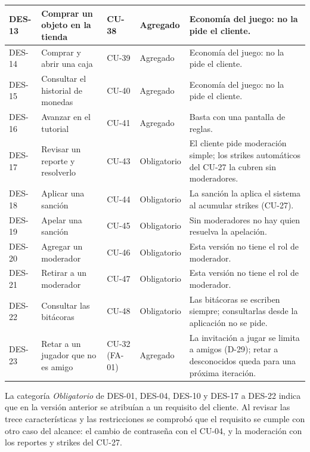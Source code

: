 \begin{center}
\begin{longtable}{|L{0.075\textwidth}|L{0.25\textwidth}|L{0.07\textwidth}|L{0.11\textwidth}|L{0.37\textwidth}|}
\mbox{DES-13} & Comprar un objeto en la tienda & CU-38 & Agregado & Economía del juego: no la pide el cliente. \\ \hline
\mbox{DES-14} & Comprar y abrir una caja & CU-39 & Agregado & Economía del juego: no la pide el cliente. \\ \hline
\mbox{DES-15} & Consultar el historial de monedas & CU-40 & Agregado & Economía del juego: no la pide el cliente. \\ \hline
\mbox{DES-16} & Avanzar en el tutorial & CU-41 & Agregado & Basta con una pantalla de reglas. \\ \hline
\mbox{DES-17} & Revisar un reporte y resolverlo & CU-43 & Obligatorio & El cliente pide moderación simple; los strikes automáticos del \mbox{CU-27} la cubren sin moderadores. \\ \hline
\mbox{DES-18} & Aplicar una sanción & CU-44 & Obligatorio & La sanción la aplica el sistema al acumular strikes (\mbox{CU-27}). \\ \hline
\mbox{DES-19} & Apelar una sanción & CU-45 & Obligatorio & Sin moderadores no hay quien resuelva la apelación. \\ \hline
\mbox{DES-20} & Agregar un moderador & CU-46 & Obligatorio & Esta versión no tiene el rol de moderador. \\ \hline
\mbox{DES-21} & Retirar a un moderador & CU-47 & Obligatorio & Esta versión no tiene el rol de moderador. \\ \hline
\mbox{DES-22} & Consultar las bitácoras & CU-48 & Obligatorio & Las bitácoras se escriben siempre; consultarlas desde la aplicación no se pide. \\ \hline
\mbox{DES-23} & Retar a un jugador que no es amigo & CU-32 (\mbox{FA-01}) & Agregado & La invitación a jugar se limita a amigos (\mbox{D-29}); retar a desconocidos queda para una próxima iteración. \\ \hline
\end{longtable}
\end{center}

La categoría \textit{Obligatorio} de \mbox{DES-01}, \mbox{DES-04}, \mbox{DES-10} y \mbox{DES-17} a \mbox{DES-22} indica que en la versión anterior se atribuían a un requisito del cliente. Al revisar las trece características y las restricciones se comprobó que el requisito se cumple con otro caso del alcance: el cambio de contraseña con el \mbox{CU-04}, y la moderación con los reportes y strikes del \mbox{CU-27}.
